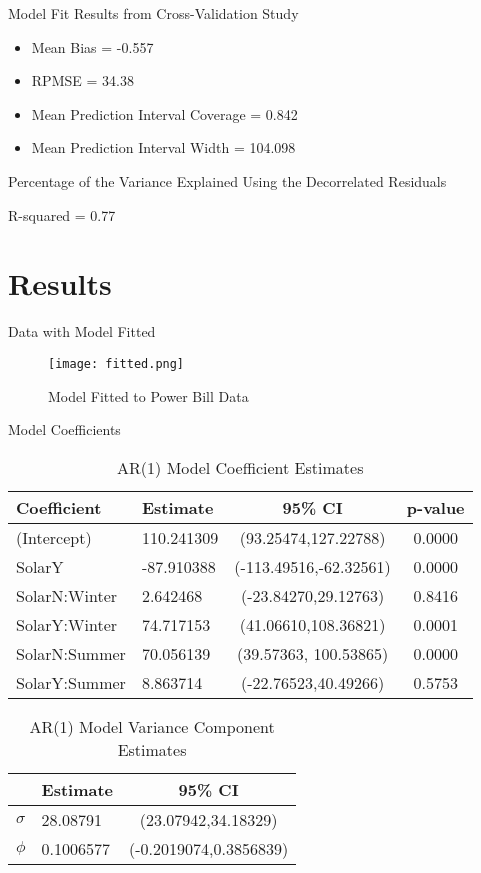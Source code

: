 \documentclass[10pt]{beamer}
\begin{document}
\begin{frame}{Model Fit}
Results from Cross-Validation Study
\begin{itemize}
\item Mean Bias = -0.557
\item RPMSE = 34.38
\item Mean Prediction Interval Coverage = 0.842
\item Mean Prediction Interval Width = 104.098
\end{itemize}
Percentage of the Variance Explained Using the Decorrelated Residuals
\itemize
\item R-squared = 0.77
\end{frame}

\section{Results}

\begin{frame}{Data with Model Fitted}
\begin{figure}
\begin{center}
\texttt{[image: fitted.png]}
\smallskip
\caption{Model Fitted to Power Bill Data}
\end{center}
\end{figure} 
\end{frame}

\begin{frame}{Model Coefficients}
\begin{table}[H]
\begin{center}
\caption{AR(1) Model Coefficient Estimates}
\begin{tabular}{l | l c c }
\hline
Coefficient &  Estimate  &   95\% CI & p-value \\
\hline
(Intercept)  &    110.241309 & (93.25474,127.22788) & 0.0000 \\
SolarY       & -87.910388 & (-113.49516,-62.32561) & 0.0000 \\
SolarN:Winter &  2.642468 & (-23.84270,29.12763) & 0.8416 \\
SolarY:Winter &  74.717153 & (41.06610,108.36821) & 0.0001 \\
SolarN:Summer &  70.056139 & (39.57363, 100.53865) & 0.0000 \\
SolarY:Summer &  8.863714 & (-22.76523,40.49266) & 0.5753 \\
\hline
\end{tabular}
\end{center}
\end{table}
\begin{table}[H]
\begin{center}
\caption{AR(1) Model Variance Component Estimates}
\begin{tabular}{l | l c }
\hline
 &  Estimate  &   95\% CI \\
\hline
$\sigma$ & 28.08791 & (23.07942,34.18329) \\
$\phi$ & 0.1006577 & (-0.2019074,0.3856839) \\
\hline
\end{tabular}
\end{center}
\end{table}
\end{frame}
\end{document}
